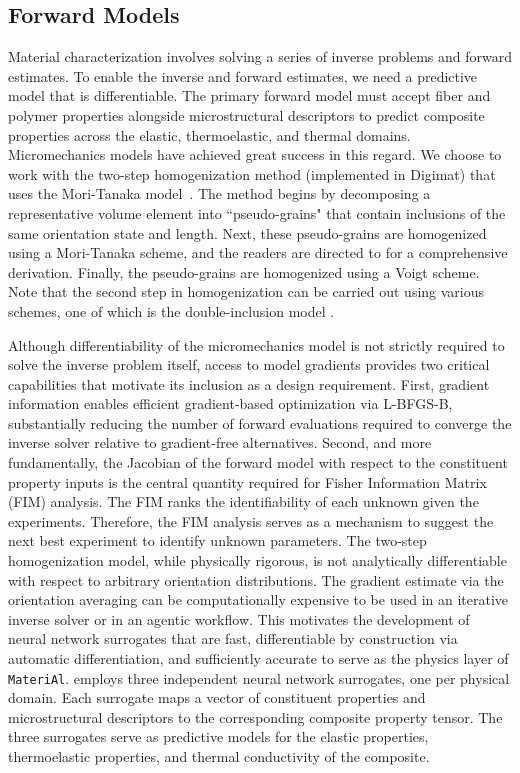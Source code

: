 \documentclass[preprint,review,10pt,number]{elsarticle}
\begin{document}
\subsection{Forward Models}
Material characterization involves solving a series of inverse problems and forward estimates. 
To enable the inverse and forward estimates, we need a predictive model that is differentiable.
The primary forward model must accept fiber and polymer properties alongside microstructural descriptors to predict composite properties across the elastic, thermoelastic, and thermal domains.
Micromechanics models have achieved great success in this regard.
We choose to work with the two-step homogenization method (implemented in Digimat) that uses the Mori-Tanaka model~\cite{mori1973average}.
The method begins by decomposing a representative volume element into ``pseudo-grains" that contain inclusions of the same orientation state and length. 
Next, these pseudo-grains are homogenized using a Mori-Tanaka scheme, and the readers are directed to \cite{tian2020micro} for a comprehensive derivation.
Finally, the pseudo-grains are homogenized using a Voigt scheme. 
Note that the second step in homogenization can be carried out using various schemes, one of which is the double-inclusion model \cite{hori1993double}.


Although differentiability of the micromechanics model is not strictly required to solve the inverse problem itself, access to model gradients provides two critical capabilities that motivate its inclusion as a design requirement.
First, gradient information enables 
efficient gradient-based optimization via L-BFGS-B, substantially reducing the number of forward evaluations required to converge the inverse solver relative to gradient-free alternatives.
Second, and more fundamentally, the Jacobian of the forward model with respect to the constituent property inputs is the central quantity required for Fisher Information Matrix (FIM) analysis.
The FIM ranks the identifiability of each unknown given the experiments.
Therefore, the FIM analysis serves as a mechanism to suggest the next best experiment to identify unknown parameters.
The two-step homogenization model, while physically rigorous, 
is not analytically differentiable with respect to arbitrary orientation distributions.
The gradient estimate via the orientation averaging can be computationally expensive to be used in an iterative inverse solver or in an agentic workflow.
This motivates the development of neural network surrogates that are fast, differentiable by construction via automatic differentiation, and sufficiently accurate to serve as the physics layer of 
\texttt{MateriAl}.
employs three independent neural network surrogates, one per physical domain. 
Each surrogate maps a vector of constituent properties and microstructural descriptors to the corresponding composite property tensor.
The three surrogates serve as predictive models for the elastic properties, thermoelastic properties, and thermal conductivity of the composite.
\end{document}
